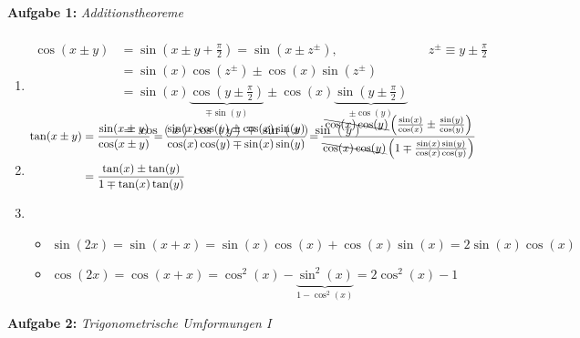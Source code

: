 
\textbf{Aufgabe 1: } \emph{Additionstheoreme}
\begin{enumerate}[label=(\alph*)]
    \item \begin{align*}
    \\[-4em]\cos(x\pm y)&=\sin\left(x\pm y+\frac{\pi}{2}\right)=\sin(x\pm z^{\pm}), && z^{\pm}\equiv y\pm\frac{\pi}{2}\\
    &=\sin(x)\cos(z^\pm)\pm\cos(x)\sin(z^\pm)\\
    &=\sin(x)\underbrace{\cos\left(y\pm\frac{\pi}{2}\right)}_{\mp\sin(y)}\pm\cos(x)\underbrace{\sin\left(y\pm\frac{\pi}{2}\right)}_{\pm\cos(y)}\\
    &=\cos(x)\cos(y)\mp\sin(x)\sin(y)
    \end{align*}
    \item \begin{align*}
    \\[-5em]\tan(x\pm y)&=\frac{\sin(x\pm y)}{\cos(x\pm y)}=\frac{\sin(x)\cos(y)\pm\cos(x)\sin(y)}{\cos(x)\cos(y)\mp\sin(x)\sin(y)}=\frac{\bcancel{\cos(x)\cos(y)}\left(\frac{\sin(x)}{\cos(x)}\pm\frac{\sin(y)}{\cos(y)}\right)}{\bcancel{\cos(x)\cos(y)}\left(1\mp\frac{\sin(x)\sin(y)}{\cos(x)\cos(y)}\right)}\\
    &=\frac{\tan(x)\pm\tan(y)}{1\mp\tan(x)\tan(y)}
    \end{align*}
    \item \begin{itemize}
    \item $\sin(2x)=\sin(x+x)=\sin(x)\cos(x)+\cos(x)\sin(x)=2\sin(x)\cos(x)$
    \item $\cos(2x)=\cos(x+x)=\cos^2(x)-\underbrace{\sin^2(x)}_{1-\cos^2(x)}=2\cos^2(x)-1$
\end{itemize}
\end{enumerate}
\vspace{0.7cm}
%
\textbf{Aufgabe 2: } \emph{Trigonometrische Umformungen I}

